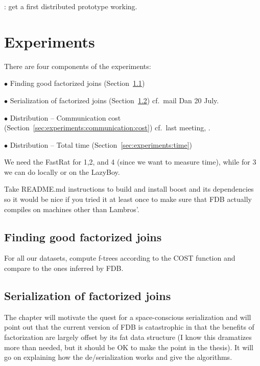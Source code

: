 {\color{red}{\bf MAIN GOAL}: get a first distributed prototype working.}


\section{Experiments}
There are four components of the experiments:

$\bullet$ Finding good factorized joins (Section~\ref{sec:experiments:cost:ftree})

$\bullet$ Serialization of factorized joins (Section~\ref{sec:experiments:compression}) cf.\ mail Dan 20 July.

$\bullet$ Distribution -- Communication cost (Section~\ref{sec:experiments:communication:cost}) cf.\ last meeting, .

$\bullet$ Distribution -- Total time (Section~\ref{sec:experiments:time})

\medskip

We need the FastRat for 1,2, and 4 (since we want to measure time), while for 3 we can do locally or on the LazyBoy.

\todo{}Take README.md instructions to build and install boost and its dependencies so it would be nice if you tried it at least once to make sure that FDB actually compiles on machines other than Lambros'.


\subsection{Finding good factorized joins}\label{sec:experiments:cost:ftree}

For all our datasets, compute f-trees according to the COST function and compare to the ones inferred by FDB.


\subsection{Serialization of factorized joins}\label{sec:experiments:compression}

The chapter will motivate the quest for a space-conscious serialization and will point out that the current version of FDB is catastrophic in that the benefits of factorization are largely offset by its fat data structure (I know this dramatizes more than needed, but it should be OK to make the point in the thesis). It will go on explaining how the de/serialization works and give the algorithms.

